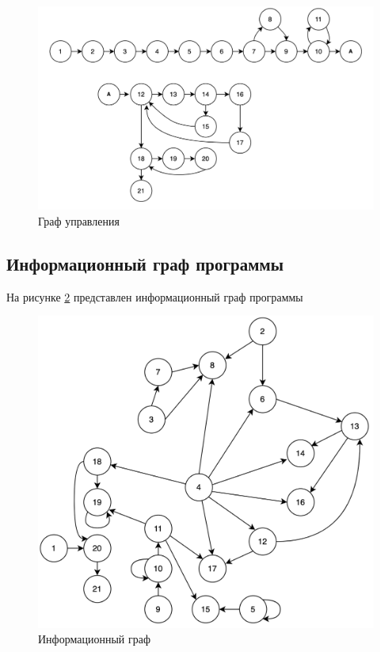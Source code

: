 \begin{figure}[h!]
	\centering
	\includegraphics[width=0.9\linewidth]{inc/img/гу.png}
	\caption{Граф управления}
	\label{fig:og}
\end{figure}

\clearpage


\subsection{Информационный граф программы}

На рисунке \ref{fig:ig} представлен информационный граф программы

\begin{figure}[h!]
	\centering
	\includegraphics[width=0.9\linewidth]{inc/img/иг.png}
	\caption{Информационный граф}
	\label{fig:ig}
\end{figure}


